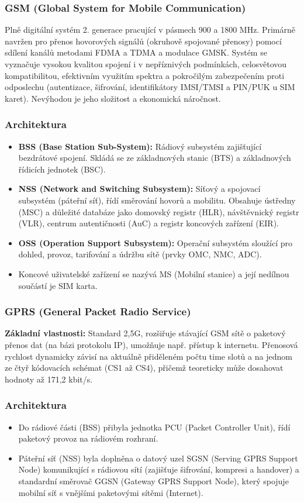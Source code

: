 		\subsubsection{GSM (Global System for Mobile Communication)} 
		Plně digitální systém 2. generace pracující v pásmech 900 a 1800 MHz. Primárně navržen pro přenos hovorových signálů (okruhově spojované přenosy) pomocí sdílení kanálů metodami FDMA a TDMA a modulace GMSK. Systém se vyznačuje vysokou kvalitou spojení i v nepříznivých podmínkách, celosvětovou kompatibilitou, efektivním využitím spektra a pokročilým zabezpečením proti odposlechu (autentizace, šifrování, identifikátory IMSI/TMSI a PIN/PUK u SIM karet). Nevýhodou je jeho složitost a ekonomická náročnost.
		\subsubsection*{Architektura}
			\begin{itemize}
				\item \textbf{BSS (Base Station Sub-System):} Rádiový subsystém zajišťující bezdrátové spojení. Skládá se ze základnových stanic (BTS) a základnových řídicích jednotek (BSC).
				\item \textbf{NSS (Network and Switching Subsystem):} Síťový a spojovací subsystém (páteřní síť),  řídí směrování hovorů a mobilitu. Obsahuje ústředny (MSC) a důležité databáze jako domovský registr (HLR), návštěvnický registr (VLR), centrum autentičnosti (AuC) a registr koncových zařízení (EIR).
				\item \textbf{OSS (Operation Support Subsystem):} Operační subsystém sloužící pro dohled, provoz, tarifování a údržbu sítě (prvky OMC, NMC, ADC).
				\item Koncové uživatelské zařízení se nazývá MS (Mobilní stanice) a její nedílnou součástí je SIM karta.
			\end{itemize}
		\subsubsection{GPRS (General Packet Radio Service)}
		\textbf{Základní vlastnosti:} Standard 2,5G, rozšiřuje stávající GSM sítě o paketový přenos dat (na bázi protokolu IP), umožňuje např. přístup k internetu. Přenosová rychlost dynamicky závisí na aktuálně přiděleném počtu time slotů a na jednom ze čtyř kódovacích schémat (CS1 až CS4), přičemž teoreticky může dosahovat hodnoty až 171,2 kbit/s.
		\subsubsection*{Architektura}
			\begin{itemize}[]
				\item Do rádiové části (BSS) přibyla jednotka PCU (Packet Controller Unit), řídí paketový provoz na rádiovém rozhraní.
				\item Páteřní síť (NSS) byla doplněna o datový uzel SGSN (Serving GPRS Support Node) komunikující s rádiovou sítí (zajišťuje šifrování, kompresi a handover) a standardní směrovač GGSN (Gateway GPRS Support Node), který spojuje mobilní síť s vnějšími paketovými sítěmi (Internet).
			\end{itemize}
